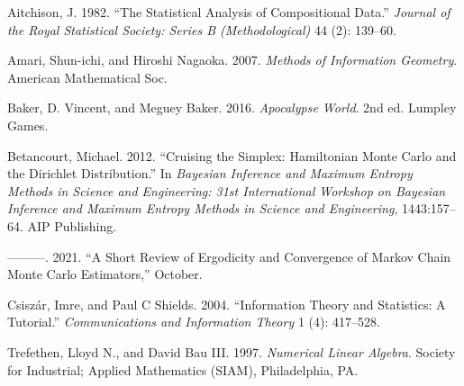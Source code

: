 \documentclass[
  letterpaper,
  DIV=11,
  numbers=noendperiod]{scrartcl}
\newlength{\cslhangindent}
\newenvironment{CSLReferences}[2] %
 {\begin{list}{}{%
  \setlength{\itemindent}{0pt}
  \setlength{\leftmargin}{0pt}
  \setlength{\parsep}{0pt}
  \ifodd #1
   \setlength{\leftmargin}{\cslhangindent}
   \setlength{\itemindent}{-1\cslhangindent}
  \fi
  \setlength{\itemsep}{#2\baselineskip}}}
 {\end{list}}
\begin{document}
\label{refs}
\begin{CSLReferences}{1}{0}
Aitchison, J. 1982. {``{The Statistical Analysis of Compositional
Data}.''} \emph{Journal of the Royal Statistical Society: Series B
(Methodological)} 44 (2): 139--60.

Amari, Shun-ichi, and Hiroshi Nagaoka. 2007. \emph{Methods of
Information Geometry}. American Mathematical Soc.

Baker, D. Vincent, and Meguey Baker. 2016. \emph{Apocalypse World}. 2nd
ed. Lumpley Games.

Betancourt, Michael. 2012. {``Cruising the Simplex: {H}amiltonian
{M}onte {C}arlo and the {D}irichlet Distribution.''} In \emph{Bayesian
Inference and Maximum Entropy Methods in Science and Engineering: 31st
International Workshop on Bayesian Inference and Maximum Entropy Methods
in Science and Engineering}, 1443:157--64. AIP Publishing.

---------. 2021. {``A Short Review of Ergodicity and Convergence of
Markov Chain Monte Carlo Estimators,''} October.

Csiszár, Imre, and Paul C Shields. 2004. {``Information Theory and
Statistics: {A} Tutorial.''} \emph{Communications and Information
Theory} 1 (4): 417--528.

Trefethen, Lloyd N., and David Bau III. 1997. \emph{Numerical Linear
Algebra}. Society for Industrial; Applied Mathematics (SIAM),
Philadelphia, PA.

\end{CSLReferences}
\end{document}

